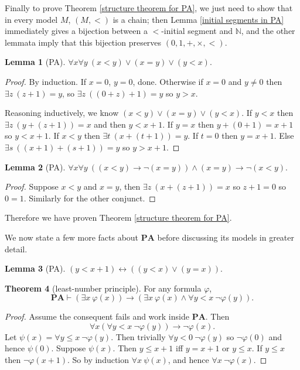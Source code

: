 \documentclass[12pt]{report}
\newcommand{\NN}{\mathbb{N}}
\renewcommand{\iff}{\leftrightarrow}
\newcommand{\PA}{\mathbf{PA}}
\newcommand{\proves}{\vdash}
\theoremstyle{definition}
\newtheorem{theorem}{Theorem}[chapter]
\newtheorem{lemma}[theorem]{Lemma}
\begin{document}
Finally to prove Theorem \ref{structure theorem for PA}, we just need to show that in every model $M$, $(M, <)$ is a chain; then Lemma \ref{initial segments in PA} immediately gives a bijection between a $<$-initial segment and $\NN$, and the other lemmata imply that this bijection preserves $(0, 1, +, \times, <)$.
\begin{lemma}[PA]
$\forall x \forall y ~(x < y) \vee (x = y) \vee (y < x)$.
\end{lemma}
\begin{proof}
By induction. If $x = 0$, $y = 0$, done.
Otherwise if $x = 0$ and $y \neq 0$ then $\exists z~(z+1)=y$, so $\exists z~((0+z)+1) = y$ so $y > x$.

Reasoning inductively, we know $(x < y) \vee (x = y) \vee (y < x)$.
If $y < x$ then $\exists z ~(y+(z+1)) = x$ and then $y < x + 1$.
If $y = x$ then $y + (0 + 1) = x + 1$ so $y < x + 1$.
If $x < y$ then $\exists t ~(x + (t+1))=y$. If $t = 0$ then $y = x + 1$. Else $\exists s ~((x+ 1) + (s+1))=y$ so $y > x + 1$.
\end{proof}
\begin{lemma}[PA]
$\forall x \forall y ~((x < y) \to \neg(x=y)) \wedge (x=y)\to\neg(x < y)$.
\end{lemma}
\begin{proof}
Suppose $x < y$ and $x = y$, then $\exists z~(x+(z+1)) = x$ so $z + 1 = 0$ so $0 = 1$. Similarly for the other conjunct.
\end{proof}
Therefore we have proven Theorem \ref{structure theorem for PA}.

We now state a few more facts about $\PA$ before discussing its models in greater detail.
\begin{lemma}[PA]
$(y < x + 1) \iff ((y < x) \vee (y = x))$.
\end{lemma}
\begin{theorem}[least-number principle]
For any formula $\varphi$,
$$\PA \proves (\exists x~\varphi(x)) \to (\exists x ~\varphi(x) \wedge \forall y < x ~\neg \varphi(y)).$$
\end{theorem}
\begin{proof}
Assume the consequent fails and work inside $\PA$. Then
$$\forall x(\forall y < x ~\neg \varphi(y)) \to \neg \varphi(x).$$
Let $\psi(x) = \forall y \leq x~\neg \varphi(y)$.
Then trivially $\forall y < 0 ~\neg \varphi(y)$ so $\neg \varphi(0)$ and hence $\psi(0)$.
Suppose $\psi(x)$. Then $y \leq x + 1$ iff $y = x + 1$ or $y \leq x$.
If $y \leq x$ then $\neg\varphi(x+1)$.
So by induction $\forall x ~\psi(x)$, and hence $\forall x~\neg\varphi(x)$.
\end{proof}
\end{document}
